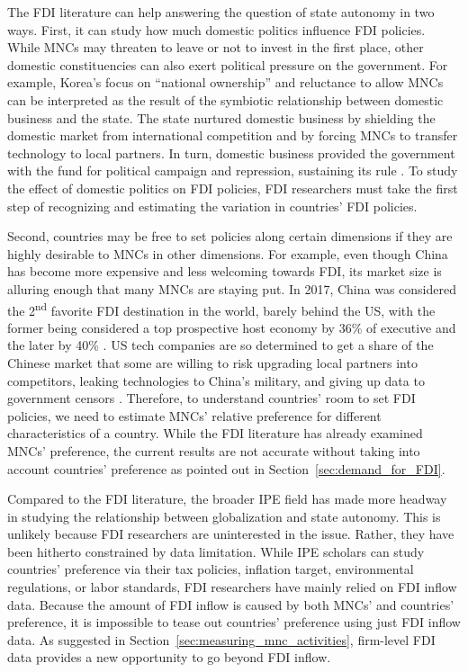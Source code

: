 The FDI literature can help answering the question of state autonomy in two
ways. First, it can study how much domestic politics influence FDI policies.
While MNCs may threaten to leave or not to invest in the first place, other
domestic constituencies can also exert political pressure on the government. For
example, Korea's focus on ``national ownership'' and reluctance to allow MNCs
can be interpreted as the result of the symbiotic relationship between domestic
business and the state. The state nurtured domestic business by shielding the
domestic market from international competition and by forcing MNCs to transfer
technology to local partners. In turn, domestic business provided the government
with the fund for political campaign and repression, sustaining its rule
\citep[ch 4]{Kang2002}. To study the effect of domestic politics on FDI
policies, FDI researchers must take the first step of recognizing and estimating
the variation in countries' FDI policies.

Second, countries may be free to set policies along certain dimensions if they
are highly desirable to MNCs in other dimensions. For example, even though China
has become more expensive and less welcoming towards FDI, its market size is
alluring enough that many MNCs are staying put. In 2017, China was considered
the 2\textsuperscript{nd} favorite FDI destination in the world, barely behind
the US, with the former being considered a top prospective host economy by 36\%
of executive and the later by 40\% \citep[Fig I.8]{UNCTAD2017}. US tech
companies are so determined to get a share of the Chinese market that some are
willing to risk upgrading local partners into competitors, leaking technologies
to China's military, and giving up data to government censors \citep{Dou2015,
  Rauhala2016}. Therefore, to understand countries' room to set FDI policies, we
need to estimate MNCs' relative preference for different characteristics of a
country. While the FDI literature has already examined MNCs' preference, the
current results are not accurate without taking into account countries'
preference as pointed out in Section~\ref{sec:demand_for_FDI}.

Compared to the FDI literature, the broader IPE field has made more headway in
studying the relationship between globalization and state autonomy. This is
unlikely because FDI researchers are uninterested in the issue. Rather, they
have been hitherto constrained by data limitation. While IPE scholars can study
countries' preference via their tax policies, inflation target, environmental
regulations, or labor standards, FDI researchers have mainly relied on FDI
inflow data. Because the amount of FDI inflow is caused by both MNCs' and
countries' preference, it is impossible to tease out countries' preference using
just FDI inflow data. As suggested in
Section~\ref{sec:measuring_mnc_activities}, firm-level FDI data provides a new
opportunity to go beyond FDI inflow.

